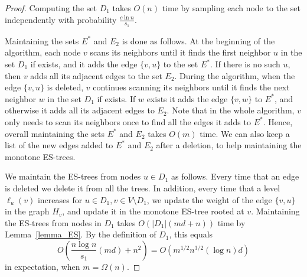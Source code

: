 \documentclass[11pt]{article}
\theoremstyle{definition}
\theoremstyle{remark}
\begin{document}
\begin{proof}
Computing the set $D_1$ takes $O(n)$ time by sampling each node to the set independently with probability $\frac{c \ln{n}}{s_1}$. 

Maintaining the sets $E^*$ and $E_2$ is done as follows. At the beginning of the algorithm, each node $v$ scans its neighbors until it finds the first neighbor $u$ in the set $D_1$ if exists, and it adds the edge $\{v,u\}$ to the set $E^*$. If there is no such $u$, then $v$ adds all its adjacent edges to the set $E_2$.
During the algorithm, when the edge $\{v,u\}$ is deleted, $v$ continues scanning its neighbors until it finds the next neighbor $w$ in the set $D_1$ if exists. If $w$ exists it adds the edge $\{v,w\}$ to $E^*$, and otherwise it adds all its adjacent edges to $E_2$. Note that in the whole algorithm, $v$ only needs to scan its neighbors once to find all the edges it adds to $E^*$. Hence, overall maintaining the sets $E^*$ and $E_2$ takes $O(m)$ time. We can also keep a list of the new edges added to $E^*$ and $E_2$ after a deletion, to help maintaining the monotone ES-trees.

We maintain the ES-trees from nodes $u \in D_1$ as follows. Every time that an edge is deleted we delete it from all the trees. In addition, every time that a level $\ell_u(v)$ increases for $u \in D_1, v \in V \setminus D_1$, we update the weight of the edge $\{v,u\}$ in the graph $H_v$, and update it in the monotone ES-tree rooted at $v$.
Maintaining the ES-trees from nodes in $D_1$ takes $O(|D_1|(md+n))$ time by Lemma~\ref{lemma_ES}. By the definition of $D_1$, this equals $$O \left( \frac{n \log{n}}{s_1} \left( md \right) + n^2 \right) =O(m^{1/2}n^{3/2} (\log{n}) d)$$ in expectation, when $m=\Omega(n).$


\end{proof}
\end{document}
